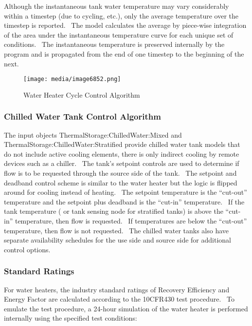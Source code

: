 Although the instantaneous tank water temperature may vary considerably within a timestep (due to cycling, etc.), only the average temperature over the timestep is reported.~ The model calculates the average by piece-wise integration of the area under the instantaneous temperature curve for each unique set of conditions.~ The instantaneous temperature is preserved internally by the program and is propagated from the end of one timestep to the beginning of the next.

\begin{figure}[hbtp] %
\centering
\texttt{[image: media/image6852.png]}
\caption{Water Heater Cycle Control Algorithm \protect \label{fig:water-heater-cycle-control-algorithm}}
\end{figure}

\subsubsection{Chilled Water Tank Control Algorithm}\label{chilled-water-tank-control-algorithm}

The input objects ThermalStorage:ChilledWater:Mixed and ThermalStorage:ChilledWater:Stratified provide chilled water tank models that do not include active cooling elements, there is only indirect cooling by remote devices such as a chiller.~ The tank's setpoint controls are used to determine if flow is to be requested through the source side of the tank.~ The setpoint and deadband control scheme is similar to the water heater but the logic is flipped around for cooling instead of heating.~ The setpoint temperature is the ``cut-out'' temperature and the setpoint plus deadband is the ``cut-in'' temperature.~ If the tank temperature ( or tank sensing node for stratified tanks) is above the ``cut-in'' temperature, then flow is requested.~ If temperatures are below the ``cut-out'' temperature, then flow is not requested.~ The chilled water tanks also have separate availability schedules for the use side and source side for additional control options.

\subsubsection{Standard Ratings}\label{standard-ratings-000}

For water heaters, the industry standard ratings of Recovery Efficiency and Energy Factor are calculated according to the 10CFR430 test procedure.~ To emulate the test procedure, a 24-hour simulation of the water heater is performed internally using the specified test conditions:

